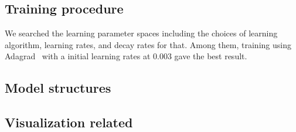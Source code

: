 \subsection{Training procedure}

We searched the learning parameter spaces including the choices of learning algorithm, learning rates, and decay rates for that. 
Among them, training using Adagrad~\cite{duchi2011adaptive} with a initial learning rates at 0.003 gave the best result. 


\subsection{Model structures}

\subsection{Visualization related}
